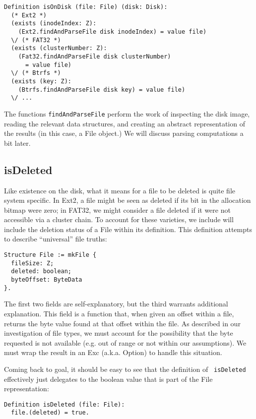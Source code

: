\documentclass[nocopyrightspace]{sigplanconf}
\begin{document}
\begin{lstlisting}
Definition isOnDisk (file: File) (disk: Disk):
  (* Ext2 *)
  (exists (inodeIndex: Z):
    (Ext2.findAndParseFile disk inodeIndex) = value file)
  \/ (* FAT32 *)
  (exists (clusterNumber: Z):
    (Fat32.findAndParseFile disk clusterNumber) 
      = value file)
  \/ (* Btrfs *)
  (exists (key: Z):
    (Btrfs.findAndParseFile disk key) = value file)
  \/ ...
\end{lstlisting}

The functions {\tt findAndParseFile} perform the work of inspecting the disk
image, reading the relevant data structures, and creating an abstract
representation of the results (in this case, a File object.) We will discuss
parsing computations a bit later.

\subsection{isDeleted}

Like existence on the disk, what it means for a file to be deleted is quite
file system specific. In Ext2, a file might be seen as deleted if its bit in
the allocation bitmap were zero; in FAT32, we might consider a file deleted if
it were not accessible via a cluster chain. To account for these varieties, we
include will include the deletion status of a File within its definition. This
definition attempts to describe ``universal'' file truths:

\begin{lstlisting}
Structure File := mkFile {
  fileSize: Z;
  deleted: boolean;
  byteOffset: ByteData
}.
\end{lstlisting}

The first two fields are self-explanatory, but the third warrants additional
explanation. This field is a function that, when given an offset within a
file, returns the byte value found at that offset within the file. As
described in our investigation of file types, we must account for the
possibility that the byte requested is not available (e.g. out of range or not
within our assumptions). We must wrap the result in an Exc (a.k.a. Option) to
handle this situation.

Coming back to goal, it should be easy to see that the definition of {\tt
isDeleted} effectively just delegates to the boolean value that is part of the
File representation:

\begin{lstlisting}
Definition isDeleted (file: File):
  file.(deleted) = true.
\end{lstlisting}
\end{document}
